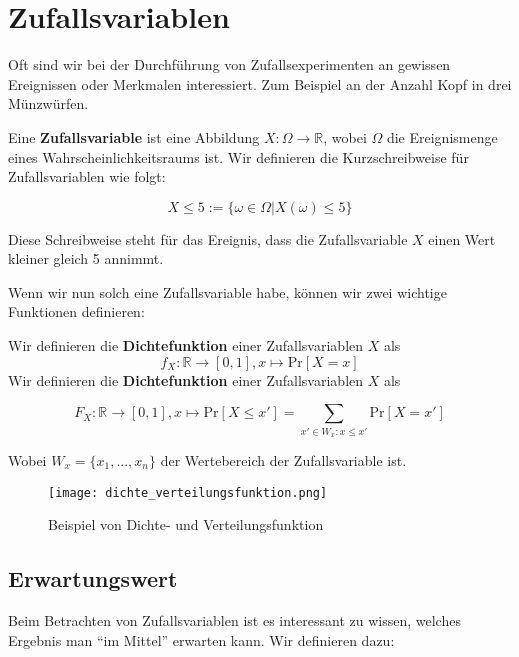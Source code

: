 \chapter{Zufallsvariablen}

Oft sind wir bei der Durchführung von Zufallsexperimenten an gewissen Ereignissen oder Merkmalen 
interessiert. Zum Beispiel an der Anzahl Kopf in drei Münzwürfen.

\begin{definition}
    Eine \textbf{Zufallsvariable} ist eine Abbildung $X : \Omega \rightarrow \mathbb{R}$, wobei $\Omega$
    die Ereignismenge eines Wahrscheinlichkeitsraums ist. Wir definieren die Kurzschreibweise für
    Zufallsvariablen wie folgt:

    $$X \leq 5  := \{\omega \in \Omega | X(\omega) \leq 5\}$$

    Diese Schreibweise steht für das Ereignis, dass die Zufallsvariable $X$ einen Wert kleiner gleich
    5 annimmt.
\end{definition}
\bigskip

Wenn wir nun solch eine Zufallsvariable habe, können wir zwei wichtige Funktionen definieren:

\begin{definition}
    Wir definieren die \textbf{Dichtefunktion} einer Zufallsvariablen $X$ als
    $$f_X : \mathbb{R} \rightarrow [0, 1], x \mapsto \text{Pr}[X = x]$$
    Wir definieren die \textbf{Dichtefunktion} einer Zufallsvariablen $X$ als

    $$F_X : \mathbb{R} \rightarrow [0, 1], x \mapsto \text{Pr}[X \leq x'] = \sum_{x' \in W_x : x \leq x'} \text{Pr}[X = x']$$

    Wobei $W_x = \{x_1, ... , x_n\}$ der Wertebereich der Zufallsvariable ist.
\end{definition}
\pagebreak

\begin{figure}[h]
    \centering
    \texttt{[image: dichte\_verteilungsfunktion.png]}
    \caption{Beispiel von Dichte- und Verteilungsfunktion}
\end{figure}
 
\section{Erwartungswert}

Beim Betrachten von Zufallsvariablen ist es interessant zu wissen, welches Ergebnis man “im Mittel” 
erwarten kann. Wir definieren dazu:

